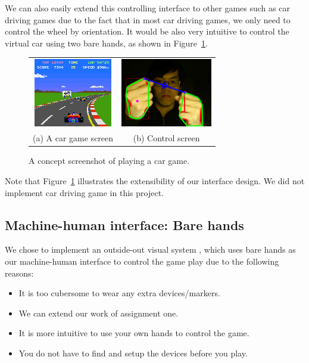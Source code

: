\documentclass[10pt,twocolumn,letterpaper]{article}
\begin{document}
We can also easily extend this controlling interface to other 
games such as car driving games due to the fact that in most 
car driving games, we only need to control the wheel by 
orientation. It would be also very intuitive to control 
the virtual car using two bare hands, as shown in Figure~\ref{fig:cargame}.
\begin{figure}[h]
\centering
\begin{tabular}{cc}
\includegraphics[height=3cm]{cargame.png} &
\includegraphics[height=3cm]{gesture0047.png} \\
(a) A car game screen &
(b) Control screen
\end{tabular}
\caption{A concept screenshot of playing a car game.}
\label{fig:cargame}
\end{figure}

Note that Figure~\ref{fig:cargame} illustrates the extensibility of 
our interface design. We did not implement car driving game in this project.

\subsection{Machine-human interface: Bare hands}
\label{sec:whybarehands}
We chose to implement an outside-out 
visual system \cite{outout}, which
uses bare hands as our machine-human interface 
to control the game play due to the following reasons:

\begin{itemize}
	\item It is too cubersome to wear any extra devices/markers.
	\item We can extend our work of assignment one.
	\item It is more intuitive to use your own hands to control the game.
	\item You do not have to find and setup the devices before you play.
\end{itemize}
\end{document}
